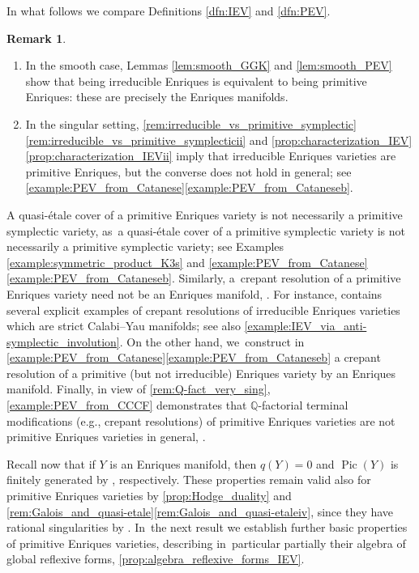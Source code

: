 \documentclass[JEP,XML,SOM,Unicode,published]{cedram}
\theoremstyle{plain}
\theoremstyle{definition}
\newtheorem{rem}[thm]{Remark}
\newcommand{\Q}{\mathbb{Q}}
\DeclareMathOperator{\Pic}{Pic}
\begin{document}
In what follows we compare Definitions \ref{dfn:IEV} and \ref{dfn:PEV}.

\skpt
\begin{rem}
\label{rem:irreducible_vs_primitive_Enriques}
\begin{enumerate}
\item
In the smooth case, Lemmas \ref{lem:smooth_GGK} and \ref{lem:smooth_PEV} show that being irreducible Enriques is equivalent to being primitive Enriques: these are precisely the Enriques manifolds.

\item
In the singular setting, \autoref{rem:irreducible_vs_primitive_symplectic}\eqref{rem:irreducible_vs_primitive_symplecticii} and \autoref{prop:characterization_IEV}\eqref{prop:characterization_IEVii} imply that irreducible Enriques varieties are primitive Enriques, but the converse does not hold in general; see \autoref{example:PEV_from_Catanese}\eqref{example:PEV_from_Cataneseb}.
\end{enumerate}
\end{rem}

A quasi-étale cover of a primitive Enriques variety is not necessarily a primitive symplectic variety, as~a quasi-étale cover of a primitive symplectic variety is not necessarily a primitive symplectic variety; see Examples \ref{example:symmetric_product_K3s} and \ref{example:PEV_from_Catanese}\eqref{example:PEV_from_Cataneseb}.
Similarly, a~crepant resolution of a primitive Enriques variety need not be an Enriques manifold, \cf \cite[Rem.\,3.3(2)]{BL21}. For instance, \cite[\S 4]{CGM19} contains several explicit examples of crepant resolutions of irreducible Enriques varieties which are strict Calabi--Yau manifolds; see also \autoref{example:IEV_via_anti-symplectic_involution}.
On the other hand, we~construct in \autoref{example:PEV_from_Catanese}\eqref{example:PEV_from_Cataneseb} a crepant resolution of a primitive (but not irreducible) Enriques variety by an Enriques manifold.
Finally, in view of \autoref{rem:Q-fact_very_sing}, \autoref{example:PEV_from_CCCF} demonstrates that $\Q$\nobreakdash-factorial terminal modifications (e.g., crepant resolutions) of primitive Enriques varieties are not primitive Enriques varieties in general, \cf \cite[Prop.\,11]{Schwald20}.

Recall now that if $Y$ is an Enriques manifold, then $q(Y) = 0$ and $\Pic(Y)$ is finitely generated by \cite[Prop.\,2.6 \& Prop.\,2.8]{OS11a}, respectively. These properties remain valid also for primitive Enriques varieties by \autoref{prop:Hodge_duality} and \autoref{rem:Galois_and_quasi-etale}\eqref{rem:Galois_and_quasi-etaleiv}, since they have rational singularities by \cite[Th.\,5.22]{KM98}. In~the next result we establish further basic properties of primitive Enriques varieties, describing in~particular partially their algebra of global reflexive forms, \cf \autoref{prop:algebra_reflexive_forms_IEV}.
\end{document}
